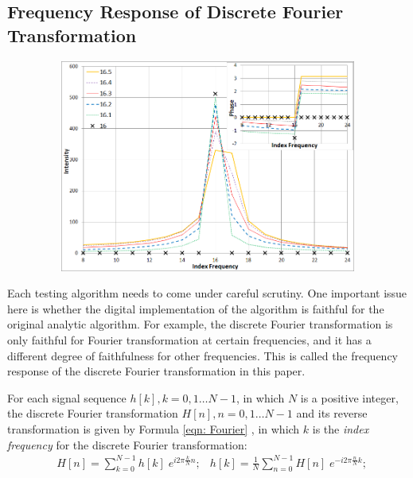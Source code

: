 \documentclass[twoside]{article}
\numberwithin{equation}{section}
\begin{document}
\subsection{Frequency Response of Discrete Fourier Transformation}

\begin{figure}%
\includegraphics[width=4.5in,height=2.75in]{FFT_Unfaithful.png} 
\label{fig: FFT_Unfaithful}
\end{figure}

Each testing algorithm needs to come under careful scrutiny.  
One important issue here is whether the digital implementation of the algorithm is faithful for the original analytic algorithm.  
For example, the discrete Fourier transformation is only faithful for Fourier transformation at certain frequencies, and it has a different degree of faithfulness for other frequencies.  
This is called the frequency response of the discrete Fourier transformation in this paper.

For each signal sequence $h[k], k = 0, 1 \dots  N-1$, in which $N$ is a positive integer, the discrete Fourier transformation $H[n], n = 0, 1 \dots  N-1$ and its reverse transformation is given by Formula \eqref{eqn: Fourier} \cite{Numerical_Recipes}, in which $k$ is the \emph{index frequency} for the discrete Fourier transformation:
\begin{align}
\label{eqn: Fourier}
& H[n]=\sum_{k=0}^{N-1}h[k] \; e^{i 2\pi \frac{k}{N} n};
& h[k]=\frac{1}{N} \sum_{n=0}^{N-1}H[n] \; e^{-i 2\pi \frac{n}{N} k};
\end{align}
\end{document}
